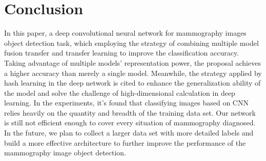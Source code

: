 \section{Conclusion}
\label{sec:Conc}

In this paper, a deep convolutional neural 
network for mammography images object detection 
task, which employing the strategy of combining 
multiple model fusion transfer and transfer 
learning to improve the classification accuracy. 
Taking advantage of multiple models’ 
representation power, the proposal achieves a 
higher accuracy than merely a single model. 
Meanwhile, the strategy applied by hash 
learning in the deep network is cited to 
enhance the generalization ability of the 
model and solve the challenge of 
high-dimensional calculation in deep learning.
In the experiments, it's found that classifying 
images based on CNN relies heavily on the 
quantity and breadth of the training data set. 
Our network is still not efficient enough to 
cover every situation of mammography diagnosed. 
In the future, we plan to collect a larger 
data set with more detailed labels and build 
a more effective architecture to further 
improve the performance of the mammography 
image object detection.